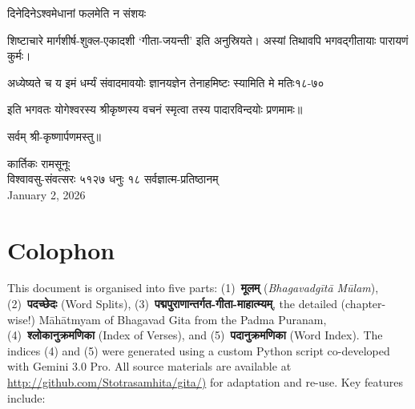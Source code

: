 {दिनेदिनेऽश्वमेधानां फलमेति न संशयः\footnotemark}

शिष्टाचारे मार्गशीर्ष-शुक्ल-एकादशी `गीता-जयन्ती' इति अनुस्रियते। अस्यां तिथावपि भगवद्गीतायाः पारायणं कुर्मः।

\annotwolineshloka
{अध्येष्यते च य इमं धर्म्यं संवादमावयोः}
{ज्ञानयज्ञेन तेनाहमिष्टः स्यामिति मे मतिः}{१८-७०}

\noindent इति भगवतः योगेश्वरस्य श्रीकृष्णस्य वचनं स्मृत्वा तस्य पादारविन्दयोः प्रणमामः॥


\centerline{सर्वम् श्री-कृष्णार्पणमस्तु॥}

\medskip
{} \hfill कार्तिकः रामसूनूः\\
विश्वावसु-संवत्सरः ५१२७ धनुः १८ \hfill सर्वज्ञात्म-प्रतिष्ठानम्\\
January 2, 2026

\begingroup
\centering{}
\chapter*{ Colophon}
\endgroup

This document is organised into five parts: (1)~\textbf{मूलम्} (\textit{Bhagavadgītā Mūlam}), (2)~\textbf{पद\-च्छेदः} (Word Splits), (3)~\textbf{पद्मपुराणान्तर्गत-गीता-माहात्म्यम्}, the detailed (chapter-wise!) Māhātmyam of Bhagavad Gita from the Padma Puranam, (4)~\textbf{श्लोकानुक्रमणिका} (Index of Verses), and (5)~\textbf{पदानुक्रमणिका} (Word Index). The indices (4) and (5) were generated using a custom Python script co-developed with Gemini 3.0 Pro. All source materials are available at \url{http://github.com/Stotrasamhita/gita/)} for adaptation and re-use. Key features include:

